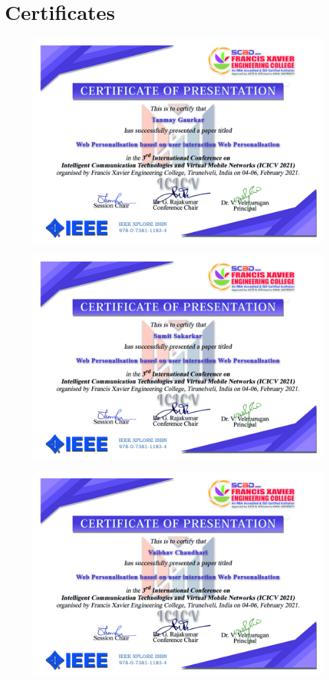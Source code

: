 \newpage
\chapter{Certificates}
\begin{figure}[h!]
    \begin{center}
        \includegraphics[scale=0.5]{cert}
    \end{center}
\end{figure}

\begin{figure}[h!]
    \begin{center}
        \includegraphics[scale=0.5]{cert1}
    \end{center}
\end{figure}
\begin{figure}[h!]
    \begin{center}
        \includegraphics[scale=0.5]{cert2}
    \end{center}
\end{figure}